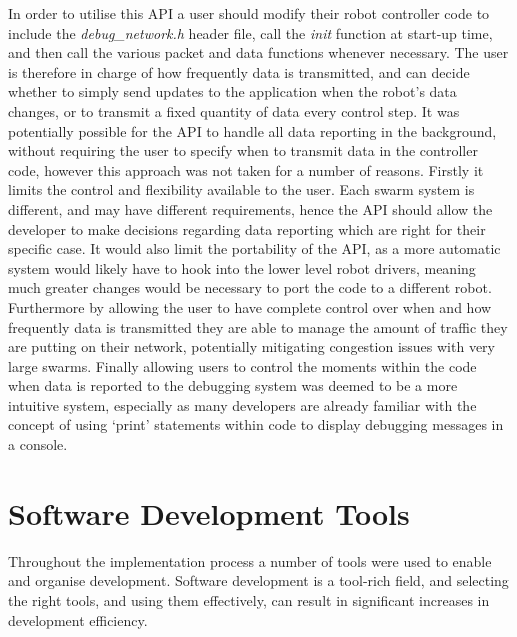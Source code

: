 In order to utilise this API a user should modify their robot controller code to include the \textit{debug\_network.h} header file, call the \textit{init} function at start-up time, and then call the various packet and data functions whenever necessary. The user is therefore in charge of how frequently data is transmitted, and can decide whether to simply send updates to the application when the robot's data changes, or to transmit a fixed quantity of data every control step. It was potentially possible for the API to handle all data reporting in the background, without requiring the user to specify when to transmit data in the controller code, however this approach was not taken for a number of reasons. Firstly it limits the control and flexibility available to the user. Each swarm system is different, and may have different requirements, hence the API should allow the developer to make decisions regarding data reporting which are right for their specific case. It would also limit the portability of the API, as a more automatic system would likely have to hook into the lower level robot drivers, meaning much greater changes would be necessary to port the code to a different robot. Furthermore by allowing the user to have complete control over when and how frequently data is transmitted they are able to manage the amount of traffic they are putting on their network, potentially mitigating congestion issues with very large swarms. Finally allowing users to control the moments within the code when data is reported to the debugging system was deemed to be a more intuitive system, especially as many developers are already familiar with the concept of using `print' statements within code to display debugging messages in a console.


\section{Software Development Tools}

Throughout the implementation process a number of tools were used to enable and organise development. Software development is a tool-rich field, and selecting the right tools, and using them effectively, can result in significant increases in development efficiency. 

